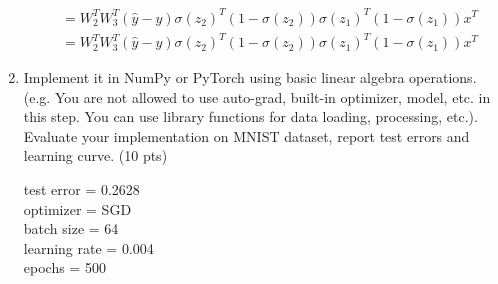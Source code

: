 \documentclass[10pt]{article}
\theoremstyle{definition}
\newenvironment{soln}{
    \leavevmode\color{blue}\ignorespaces
}{}
\begin{document}
\begin{enumerate}
\begin{soln}
\begin{align*}
                                                  & = W_2 ^ T  W_3 ^ T (\hat{y} - y)  \sigma(z_2) ^ T (1 - \sigma(z_2)) \sigma(z_1) ^ T (1 - \sigma(z_1)) x ^ T                                                     \\
                                                  & = W_2 ^ T  W_3 ^ T (\hat{y} - y)  \sigma(z_2) ^ T (1 - \sigma(z_2)) \sigma(z_1) ^ T (1 - \sigma(z_1)) x ^ T
              \end{align*}
          \end{soln}
    \item Implement it in NumPy or PyTorch using basic linear algebra operations. (e.g. You are not allowed to use auto-grad, built-in optimizer, model, etc. in this step. You can use library functions for data loading, processing, etc.). Evaluate your implementation on MNIST dataset, report test errors and learning curve. (10 pts) \\
          \begin{soln}
              test error = 0.2628 \\
              optimizer = SGD \\
              batch size = 64 \\
              learning rate = 0.004 \\
              epochs = 500 \\
              \begin{figure}[H]
                \centering  %

\end{figure}
\end{soln}
\end{enumerate}
\end{document}
